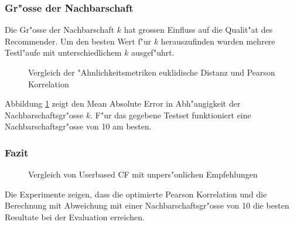 \documentclass[a4paper, 12pt]{article}
\begin{document}
\subsubsection{Gr"osse der Nachbarschaft}
\label{sec:neighborhoodsize}

Die Gr"osse der Nachbarschaft $k$ hat grossen Einfluss auf die Qualit"at des Recommender. Um den besten Wert f"ur $k$ herauszufinden wurden mehrere Testl"aufe mit unterschiedlichem $k$ ausgef"uhrt.

\begin{figure}
  \centering
{}

\caption{Vergleich der "Ahnlichkeitsmetriken euklidische Distanz und Pearson Korrelation}
\label{fig:nrofneighbors1}
\end{figure}

Abbildung \ref{fig:nrofneighbors1} zeigt den Mean Absolute Error in Abh"angigkeit der Nachbarschaftsgr"osse $k$. F"ur das gegebene Testset funktioniert eine Nachbarschaftsgr"osse von 10 am besten.

\subsubsection{Fazit}

\begin{figure}
  \centering
{}

\caption{Vergleich von Userbased CF mit unpers"onlichen Empfehlungen}
\label{fig:uuvsbui}
\end{figure}

Die Experimente zeigen, dass die optimierte Pearson Korrelation und die Berechnung mit Abweichung mit einer Nachbarschaftsgr"osse von 10 die besten Resultate bei der Evaluation erreichen.
\end{document}
